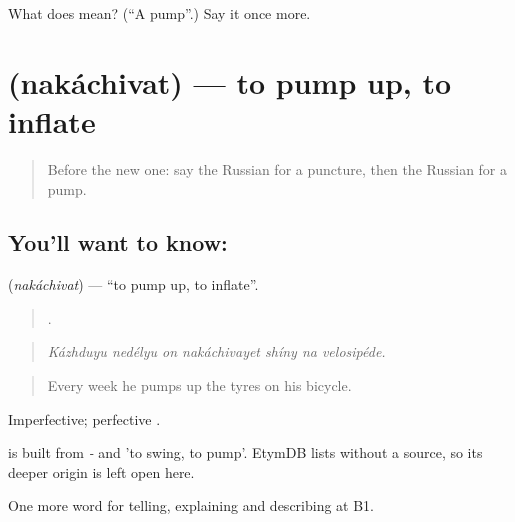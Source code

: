 \begin{tcolorbox}[breakable,colback=teal!4,colframe=teal!35!black,title={Before you move on}]
What does  mean? (\textquotedblleft{}A pump\textquotedblright{}.) Say it once more.
\end{tcolorbox}
\section[\texorpdfstring{\ru{накачивать} (nakáchivat)}{накачивать (nakáchivat)}]{ (nakáchivat) — to pump up, to inflate}

\label{lesson:RU-C405-nakachivat}



\begin{quote}
Before the new one: say the Russian for a puncture, then the Russian for a pump.
\end{quote}

\subsection*{You'll want to know: }
\textbf{} (\emph{nakáchivat}) — \textquotedblleft{}to pump up, to inflate\textquotedblright{}.

\begin{quote}
      .
\end{quote}

\begin{quote}
\emph{Kázhduyu nedélyu on nakáchivayet shíny na velosipéde.}
\end{quote}

\begin{quote}
Every week he pumps up the tyres on his bicycle.
\end{quote}

Imperfective; perfective \emph{}.

\begin{cousinweb}
\emph{} is built from \emph{-} and \emph{} 'to swing, to pump'. EtymDB lists \emph{} without a source, so its deeper origin is left open here.
\end{cousinweb}

\begin{grammarlens}[title={What you've built}]
One more word for telling, explaining and describing at B1.
\end{grammarlens}

